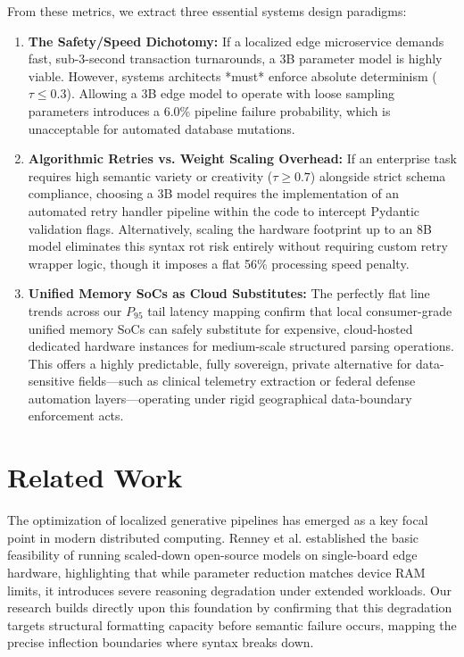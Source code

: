 \documentclass[11pt,journal,compsoc,onecolumn]{IEEEtran}
\begin{document}
From these metrics, we extract three essential systems design paradigms:
\begin{enumerate}
    \item \textbf{The Safety/Speed Dichotomy:} If a localized edge microservice demands fast, sub-3-second transaction turnarounds, a 3B parameter model is highly viable. However, systems architects *must* enforce absolute determinism ($\tau \le 0.3$). Allowing a 3B edge model to operate with loose sampling parameters introduces a 6.0\% pipeline failure probability, which is unacceptable for automated database mutations.
    \item \textbf{Algorithmic Retries vs. Weight Scaling Overhead:} If an enterprise task requires high semantic variety or creativity ($\tau \ge 0.7$) alongside strict schema compliance, choosing a 3B model requires the implementation of an automated retry handler pipeline within the code to intercept Pydantic validation flags. Alternatively, scaling the hardware footprint up to an 8B model eliminates this syntax rot risk entirely without requiring custom retry wrapper logic, though it imposes a flat 56\% processing speed penalty.
    \item \textbf{Unified Memory SoCs as Cloud Substitutes:} The perfectly flat line trends across our $P_{95}$ tail latency mapping confirm that local consumer-grade unified memory SoCs can safely substitute for expensive, cloud-hosted dedicated hardware instances for medium-scale structured parsing operations. This offers a highly predictable, fully sovereign, private alternative for data-sensitive fields—such as clinical telemetry extraction or federal defense automation layers—operating under rigid geographical data-boundary enforcement acts.
\end{enumerate}

\section{Related Work}
\label{sec:related}
The optimization of localized generative pipelines has emerged as a key focal point in modern distributed computing. Renney et al. \cite{renney2026} established the basic feasibility of running scaled-down open-source models on single-board edge hardware, highlighting that while parameter reduction matches device RAM limits, it introduces severe reasoning degradation under extended workloads. Our research builds directly upon this foundation by confirming that this degradation targets structural formatting capacity before semantic failure occurs, mapping the precise inflection boundaries where syntax breaks down.
\end{document}
